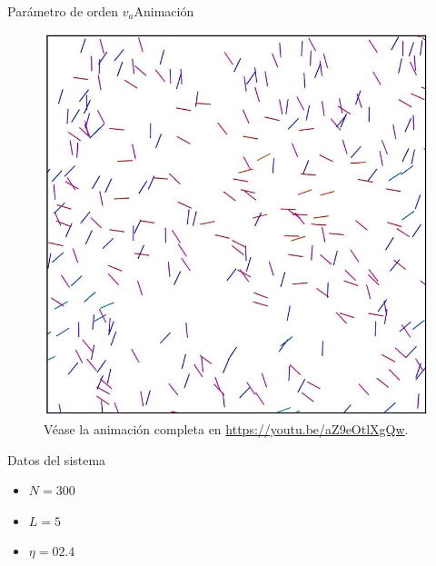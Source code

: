 \documentclass{beamer}
\begin{document}
            \begin{frame}{Parámetro de orden $v_a$}{Animación}
                \begin{minipage}[t]{0.60\textwidth}
                    \begin{figure}[H!]
                        \includegraphics[height=.65\textheight]{./animation-n300-eta2p4-frame}
                        \caption*{Véase la animación completa en \url{https://youtu.be/aZ9eOtlXgQw}.}
                        \label{fig:va_2}
                    \end{figure}
                \end{minipage}
                \hfill
                \begin{minipage}[t]{0.30\textwidth}
                    \begin{block}{Datos del sistema}
                        \begin{itemize}
                            \item $N=300$
                            \item $L=5$
                            \item $\eta=02.4$
                        \end{itemize}
                    \end{block}
                \end{minipage}
            \end{frame}
\end{document}

